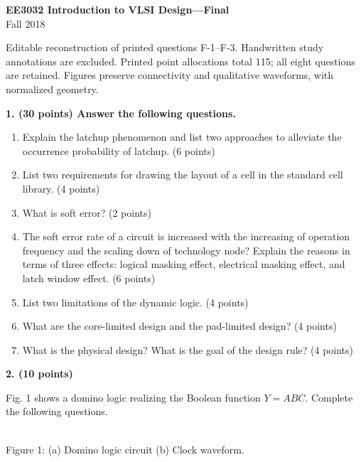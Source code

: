 \documentclass[10pt]{article}
\newcommand{\qheading}[1]{\par\medskip\textbf{#1}\par}
\begin{document}
\begin{center}{\Large\bfseries EE3032 Introduction to VLSI Design---Final}\\Fall 2018\end{center}
\small Editable reconstruction of printed questions F-1--F-3. Handwritten study annotations are excluded. Printed point allocations total 115; all eight questions are retained. Figures preserve connectivity and qualitative waveforms, with normalized geometry.\normalsize
\qheading{1. (30 points) Answer the following questions.}
\begin{enumerate}[label=(\alph*),leftmargin=7mm]
\item Explain the latchup phenomenon and list two approaches to alleviate the occurrence probability of latchup. (6 points)
\item List two requirements for drawing the layout of a cell in the standard cell library. (4 points)
\item What is soft error? (2 points)
\item The soft error rate of a circuit is increased with the increasing of operation frequency and the scaling down of technology node? Explain the reasons in terms of three effects: logical masking effect, electrical masking effect, and latch window effect. (6 points)
\item List two limitations of the dynamic logic. (4 points)
\item What are the core-limited design and the pad-limited design? (4 points)
\item What is the physical design? What is the goal of the design rule? (4 points)
\end{enumerate}
\qheading{2. (10 points)} Fig. 1 shows a domino logic realizing the Boolean function $Y=ABC$. Complete the following questions.
\begin{center}\\\small Figure 1: (a) Domino logic circuit (b) Clock waveform.\end{center}
\end{document}
